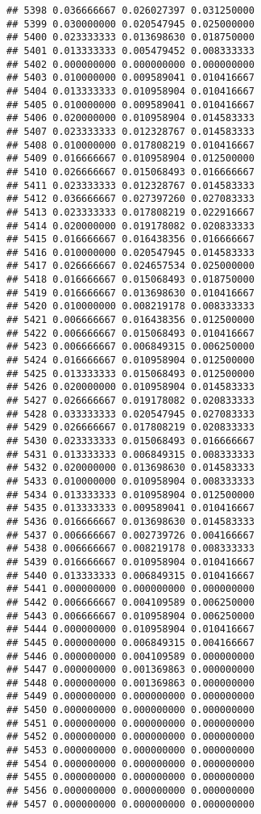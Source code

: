 \documentclass[
]{article}
\begin{document}
\begin{verbatim}
## 5398 0.036666667 0.026027397 0.031250000
## 5399 0.030000000 0.020547945 0.025000000
## 5400 0.023333333 0.013698630 0.018750000
## 5401 0.013333333 0.005479452 0.008333333
## 5402 0.000000000 0.000000000 0.000000000
## 5403 0.010000000 0.009589041 0.010416667
## 5404 0.013333333 0.010958904 0.010416667
## 5405 0.010000000 0.009589041 0.010416667
## 5406 0.020000000 0.010958904 0.014583333
## 5407 0.023333333 0.012328767 0.014583333
## 5408 0.010000000 0.017808219 0.010416667
## 5409 0.016666667 0.010958904 0.012500000
## 5410 0.026666667 0.015068493 0.016666667
## 5411 0.023333333 0.012328767 0.014583333
## 5412 0.036666667 0.027397260 0.027083333
## 5413 0.023333333 0.017808219 0.022916667
## 5414 0.020000000 0.019178082 0.020833333
## 5415 0.016666667 0.016438356 0.016666667
## 5416 0.010000000 0.020547945 0.014583333
## 5417 0.026666667 0.024657534 0.025000000
## 5418 0.016666667 0.015068493 0.018750000
## 5419 0.016666667 0.013698630 0.010416667
## 5420 0.010000000 0.008219178 0.008333333
## 5421 0.006666667 0.016438356 0.012500000
## 5422 0.006666667 0.015068493 0.010416667
## 5423 0.006666667 0.006849315 0.006250000
## 5424 0.016666667 0.010958904 0.012500000
## 5425 0.013333333 0.015068493 0.012500000
## 5426 0.020000000 0.010958904 0.014583333
## 5427 0.026666667 0.019178082 0.020833333
## 5428 0.033333333 0.020547945 0.027083333
## 5429 0.026666667 0.017808219 0.020833333
## 5430 0.023333333 0.015068493 0.016666667
## 5431 0.013333333 0.006849315 0.008333333
## 5432 0.020000000 0.013698630 0.014583333
## 5433 0.010000000 0.010958904 0.008333333
## 5434 0.013333333 0.010958904 0.012500000
## 5435 0.013333333 0.009589041 0.010416667
## 5436 0.016666667 0.013698630 0.014583333
## 5437 0.006666667 0.002739726 0.004166667
## 5438 0.006666667 0.008219178 0.008333333
## 5439 0.016666667 0.010958904 0.010416667
## 5440 0.013333333 0.006849315 0.010416667
## 5441 0.000000000 0.000000000 0.000000000
## 5442 0.006666667 0.004109589 0.006250000
## 5443 0.006666667 0.010958904 0.006250000
## 5444 0.000000000 0.010958904 0.010416667
## 5445 0.000000000 0.006849315 0.004166667
## 5446 0.000000000 0.004109589 0.000000000
## 5447 0.000000000 0.001369863 0.000000000
## 5448 0.000000000 0.001369863 0.000000000
## 5449 0.000000000 0.000000000 0.000000000
## 5450 0.000000000 0.000000000 0.000000000
## 5451 0.000000000 0.000000000 0.000000000
## 5452 0.000000000 0.000000000 0.000000000
## 5453 0.000000000 0.000000000 0.000000000
## 5454 0.000000000 0.000000000 0.000000000
## 5455 0.000000000 0.000000000 0.000000000
## 5456 0.000000000 0.000000000 0.000000000
## 5457 0.000000000 0.000000000 0.000000000

\end{verbatim}
\end{document}
